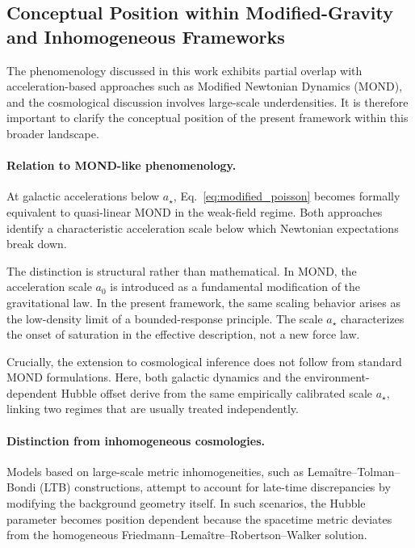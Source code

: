\subsection{Conceptual Position within Modified-Gravity and Inhomogeneous Frameworks}
  \label{subsec:conceptual_position}

  The phenomenology discussed in this work exhibits partial overlap
  with acceleration-based approaches such as Modified Newtonian Dynamics (MOND),
  and the cosmological discussion involves large-scale underdensities.
  It is therefore important to clarify the conceptual position of the
  present framework within this broader landscape.

  \paragraph{Relation to MOND-like phenomenology.}

    At galactic accelerations below $a_\star$,
    Eq.~\eqref{eq:modified_poisson} becomes formally equivalent
    to quasi-linear MOND in the weak-field regime.
    Both approaches identify a characteristic acceleration scale
    below which Newtonian expectations break down.

    The distinction is structural rather than mathematical.
    In MOND, the acceleration scale $a_0$ is introduced as a
    fundamental modification of the gravitational law.
    In the present framework, the same scaling behavior arises
    as the low-density limit of a bounded-response principle.
    The scale $a_\star$ characterizes the onset of saturation in
    the effective description, not a new force law.

    Crucially, the extension to cosmological inference does not
    follow from standard MOND formulations.
    Here, both galactic dynamics and the environment-dependent
    Hubble offset derive from the same empirically calibrated scale
    $a_\star$, linking two regimes that are usually treated independently.

  \paragraph{Distinction from inhomogeneous cosmologies.}

    Models based on large-scale metric inhomogeneities,
    such as Lemaître--Tolman--Bondi (LTB) constructions,
    attempt to account for late-time discrepancies by modifying
    the background geometry itself.
    In such scenarios, the Hubble parameter becomes position dependent
    because the spacetime metric deviates from the homogeneous
    Friedmann--Lemaître--Robertson--Walker solution.

